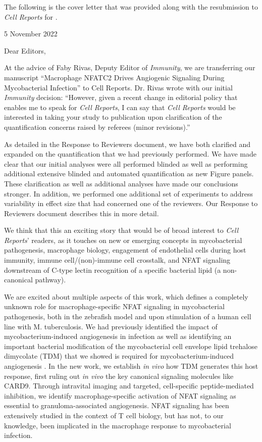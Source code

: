 The following is the cover letter that was provided along with the resubmission to \textit{Cell Reports} for \citet{Brewer2022}.

\begin{flushright}
5 November 2022
\end{flushright}

Dear Editors,

At the advice of Faby Rivas, Deputy Editor of \textit{Immunity}, we are transferring our manuscript “Macrophage NFATC2 Drives Angiogenic Signaling During Mycobacterial Infection” to Cell Reports. Dr. Rivas wrote with our initial \textit{Immunity} decision: ``However, given a recent change in editorial policy that enables me to speak for \textit{Cell Reports}, I can say that \textit{Cell Reports} would be interested in taking your study to publication upon clarification of the quantification concerns raised by referees (minor revisions).''

As detailed in the Response to Reviewers document, we have both clarified and expanded on the quantification that we had previously performed. We have made clear that our initial analyses were all performed blinded as well as performing additional extensive blinded and automated quantification as new Figure panels. These clarification as well as additional analyses have made our conclusions stronger. In addition, we performed one additional set of experiments to address variability in effect size that had concerned one of the reviewers. Our Response to Reviewers document describes this in more detail.

We think that this an exciting story that would be of broad interest to \textit{Cell Reports}' readers, as it touches on new or emerging concepts in mycobacterial pathogenesis, macrophage biology, engagement of endothelial cells during host immunity, immune cell/(non)\hyp{}immune cell crosstalk, and NFAT signaling downstream of C\hyp{}type lectin recognition of a specific bacterial lipid (a non\hyp{}canonical pathway).

We are excited about multiple aspects of this work, which defines a completely unknown role for macrophage\hyp{}specific NFAT signaling in mycobacterial pathogenesis, both in the zebrafish model and upon stimulation of a human cell line with M. tuberculosis. We had previously identified the impact of mycobacterium\hyp{}induced angiogenesis in infection \citep{Oehlers2015} as well as identifying an important bacterial modification of the mycobacterial cell envelope lipid trehalose dimycolate (TDM) that we showed is required for mycobacterium\hyp{}induced angiogenesis \citep{Walton2018}. In the new work, we establish \textit{in vivo} how TDM generates this host response, first ruling out \textit{in vivo} the key canonical signaling molecules like CARD9. Through intravital imaging and targeted, cell\hyp{}specific peptide\hyp{}mediated inhibition, we identify macrophage\hyp{}specific activation of NFAT signaling as essential to granuloma\hyp{}associated angiogenesis. NFAT signaling has been extensively studied in the context of T cell biology, but has not, to our knowledge, been implicated in the macrophage response to mycobacterial infection.

